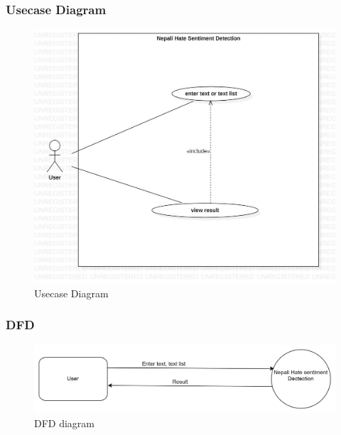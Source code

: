 \subsubsection{Usecase Diagram}
\begin{figure}[h]
\centering
\includegraphics[scale=0.5]{images/usecase.png}
\caption{Usecase Diagram}
\end{figure}
\newpage
\subsubsection{DFD}
\begin{figure}[h]
\centering
\includegraphics[scale=0.21]{images/dfd.png}
\caption{DFD diagram}
\end{figure}


